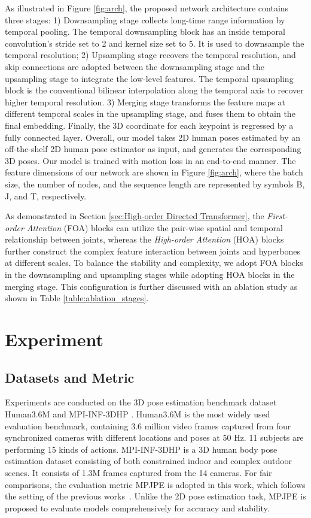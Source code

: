 \documentclass{article}
\begin{document}
As illustrated in Figure \ref{fig:arch}, the proposed network architecture contains three stages: 1) Downsampling stage collects long-time range information by temporal pooling. The temporal downsampling block has an inside temporal convolution’s stride set to 2 and kernel size set to 5. It is used to downsample the temporal resolution; 2) Upsampling stage recovers the temporal resolution, and skip connections are adopted between the downsampling stage and the upsampling stage to integrate the low-level features. The temporal upsampling block is the conventional bilinear interpolation along the temporal axis to recover higher temporal resolution. 3) Merging stage transforms the feature maps at different temporal scales in the upsampling stage, and fuses them to obtain the final embedding. Finally, the 3D coordinate for each keypoint is regressed by a fully connected layer. Overall, our model takes 2D human poses estimated by an off-the-shelf 2D human pose estimator as input, and generates the corresponding 3D poses. Our model is trained with motion loss \cite{wang2020-motion} in an end-to-end manner. The feature dimensions of our network are shown in Figure \ref{fig:arch}, where the batch size, the number of nodes, and the sequence length are represented by symbols B, J, and T, respectively.

As demonstrated in Section \ref{sec:High-order Directed Transformer}, the \textit{First-order Attention} (FOA) blocks can utilize the pair-wise spatial and temporal relationship between joints, whereas the \textit{High-order Attention} (HOA) blocks further construct the complex feature interaction between joints and hyperbones at different scales. To balance the stability and complexity, we adopt FOA blocks in the downsampling and upsampling stages while adopting HOA blocks in the merging stage. This configuration is further discussed with an ablation study as shown in Table \ref{table:ablation_stages}.


\section{Experiment}
\subsection{Datasets and Metric}
Experiments are conducted on the 3D pose estimation benchmark dataset Human3.6M\cite{Ionescu_POSE_TPAMI14} and MPI-INF-3DHP \cite{Mehta_RCFSXT_3DV17}. Human3.6M is the most widely used evaluation benchmark, containing 3.6 million video frames captured from four synchronized cameras with different locations and poses at 50 Hz. 11 subjects are performing 15 kinds of actions. MPI-INF-3DHP is a 3D human body pose estimation dataset consisting of both constrained indoor and complex outdoor scenes.  It consists of 1.3M frames captured from the 14 cameras. For fair comparisons, the evaluation metric MPJPE is adopted in this work, which follows the setting of the previous works~\cite{hu(2021)-conditional,cai2019-exploiting,ZhangCVPR22MixSTE,zhao2022-graformer}. Unlike the 2D pose estimation task, MPJPE is proposed to evaluate models comprehensively for accuracy and stability.
\end{document}
